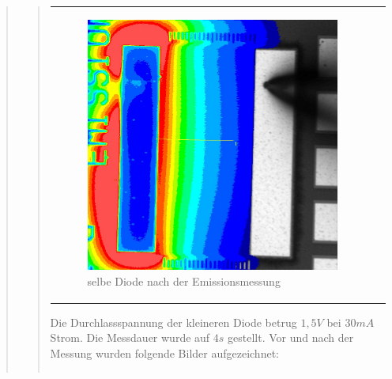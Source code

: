 \begin{quote}
\begin{quote}
\begin{center}
\begin{tabular}{ll}
\begin{minipage}{0.6\textwidth}
                         \begin{figure}[H]
                            \label{fig:}
                            \includegraphics[scale=0.25, trim = 0cm 0cm 0cm
                            0cm,
                            clip]{./Emissionsbilder/drei/nach_Emissionsmessung_Distanz.jpg}
                            \caption{selbe Diode nach der Emissionsmessung}
                        \end{figure}
                   \vspace{-1.5em}
    
                    \end{minipage}
    
                \end{tabular}
                \end{center}
                
        \vspace{2em}
        
        Die Durchlassspannung der kleineren Diode betrug $1,5 V$ bei $30 mA$
        Strom. Die Messdauer wurde auf $4s$ gestellt. Vor und nach der Messung
        wurden folgende Bilder aufgezeichnet:
        
         
         \begin{center}
                \begin{tabular}{ll}
    

\end{tabular}
\end{center}
\end{quote}
\end{quote}
